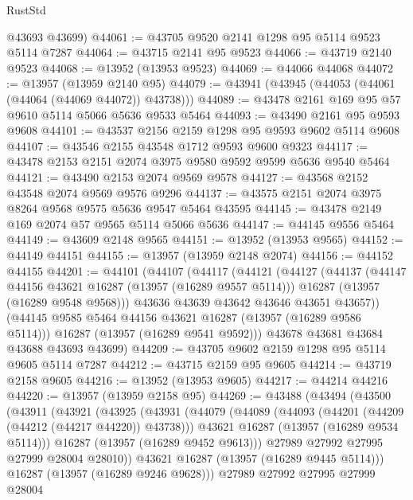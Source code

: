 \begin{lexlean}{RustStd}
\begin{coremodule}
      @43693
      @43699)
@44061 := @43705 @9520 @2141 @1298 @95 @5114 @9523 @5114 @7287
@44064 := @43715 @2141 @95 @9523
@44066 := @43719 @2140 @9523
@44068 := @13952 (@13953 @9523)
@44069 := @44066 @44068
@44072 := @13957 (@13959 @2140 @95)
@44079 := @43941 (@43945 (@44053 (@44061 (@44064 (@44069 @44072)) @43738)))
@44089 := @43478 @2161 @169 @95 @57 @9610 @5114 @5066 @5636 @9533 @5464
@44093 := @43490 @2161 @95 @9593 @9608
@44101 := @43537 @2156 @2159 @1298 @95 @9593 @9602 @5114 @9608
@44107 := @43546 @2155 @43548 @1712 @9593 @9600 @9323
@44117 := @43478 @2153 @2151 @2074 @3975 @9580 @9592 @9599 @5636 @9540 @5464
@44121 := @43490 @2153 @2074 @9569 @9578
@44127 := @43568 @2152 @43548 @2074 @9569 @9576 @9296
@44137 := @43575 @2151 @2074 @3975 @8264 @9568 @9575 @5636 @9547 @5464 @43595
@44145 := @43478 @2149 @169 @2074 @57 @9565 @5114 @5066 @5636
@44147 := @44145 @9556 @5464
@44149 := @43609 @2148 @9565
@44151 := @13952 (@13953 @9565)
@44152 := @44149 @44151
@44155 := @13957 (@13959 @2148 @2074)
@44156 := @44152 @44155
@44201 := @44101
    (@44107
      (@44117
        (@44121
          (@44127
            (@44137
              (@44147 @44156 @43621 @16287 (@13957 (@16289 @9557 @5114)))
              @16287
              (@13957 (@16289 @9548 @9568)))
            @43636
            @43639
            @43642
            @43646
            @43651
            @43657))
        (@44145 @9585 @5464 @44156 @43621 @16287 (@13957 (@16289 @9586 @5114)))
        @16287
        (@13957 (@16289 @9541 @9592)))
      @43678
      @43681
      @43684
      @43688
      @43693
      @43699)
@44209 := @43705 @9602 @2159 @1298 @95 @5114 @9605 @5114 @7287
@44212 := @43715 @2159 @95 @9605
@44214 := @43719 @2158 @9605
@44216 := @13952 (@13953 @9605)
@44217 := @44214 @44216
@44220 := @13957 (@13959 @2158 @95)
@44269 := @43488
    (@43494
      (@43500
        (@43911
          (@43921
            (@43925
              (@43931
                (@44079
                  (@44089
                    (@44093 (@44201 (@44209 (@44212 (@44217 @44220)) @43738)))
                    @43621
                    @16287
                    (@13957 (@16289 @9534 @5114)))
                  @16287
                  (@13957 (@16289 @9452 @9613)))
                @27989
                @27992
                @27995
                @27999
                @28004
                @28010))
            @43621
            @16287
            (@13957 (@16289 @9445 @5114)))
          @16287
          (@13957 (@16289 @9246 @9628)))
        @27989
        @27992
        @27995
        @27999
        @28004

\end{coremodule}
\end{lexlean}
